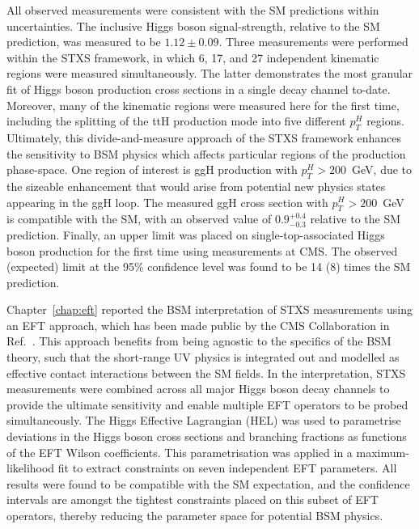 All observed measurements were consistent with the SM predictions within uncertainties. The inclusive Higgs boson signal-strength, relative to the SM prediction, was measured to be $1.12 \pm 0.09$. Three measurements were performed within the STXS framework, in which 6, 17, and 27 independent kinematic regions were measured simultaneously. The latter demonstrates the most granular fit of Higgs boson production cross sections in a single decay channel to-date. Moreover, many of the kinematic regions were measured here for the first time, including the splitting of the ttH production mode into five different $p_T^H$ regions. Ultimately, this divide-and-measure approach of the STXS framework enhances the sensitivity to BSM physics which affects particular regions of the production phase-space. One region of interest is ggH production with $p_T^H>200$~GeV, due to the sizeable enhancement that would arise from potential new physics states appearing in the ggH loop. The measured ggH cross section with $p_T^H>200$~GeV is compatible with the SM, with an observed value of $0.9^{+0.4}_{-0.3}$ relative to the SM prediction. Finally, an upper limit was placed on single-top-associated Higgs boson production for the first time using \Hgg measurements at CMS. The observed (expected) limit at the 95\% confidence level was found to be 14 (8) times the SM prediction.

Chapter~\ref{chap:eft} reported the BSM interpretation of STXS measurements using an EFT approach, which has been made public by the CMS Collaboration in Ref.~\cite{CMS-PAS-HIG-19-005}. This approach benefits from being agnostic to the specifics of the BSM theory, such that the short-range UV physics is integrated out and modelled as effective contact interactions between the SM fields. In the interpretation, STXS measurements were combined across all major Higgs boson decay channels to provide the ultimate sensitivity and enable multiple EFT operators to be probed simultaneously. The Higgs Effective Lagrangian (HEL) was used to parametrise deviations in the Higgs boson cross sections and branching fractions as functions of the EFT Wilson coefficients. This parametrisation was applied in a maximum-likelihood fit to extract constraints on seven independent EFT parameters. All results were found to be compatible with the SM expectation, and the confidence intervals are amongst the tightest constraints placed on this subset of EFT operators, thereby reducing the parameter space for potential BSM physics.

